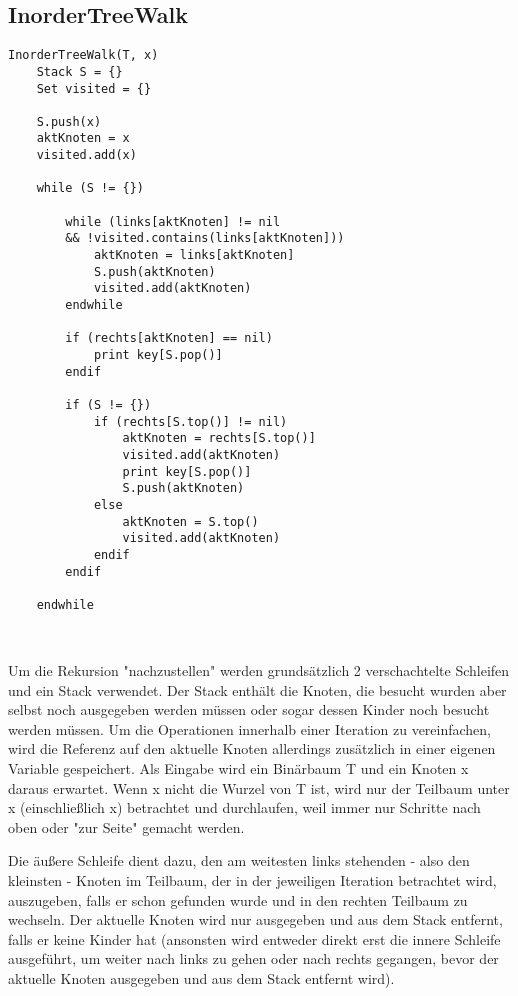 \subsection*{InorderTreeWalk}

\begin{lstlisting}
InorderTreeWalk(T, x)
	Stack S = {}
	Set visited = {}
	
	S.push(x)
	aktKnoten = x
	visited.add(x)
	
	while (S != {})
	
		while (links[aktKnoten] != nil 
		&& !visited.contains(links[aktKnoten]))
			aktKnoten = links[aktKnoten]
			S.push(aktKnoten)
			visited.add(aktKnoten)
		endwhile

		if (rechts[aktKnoten] == nil)
			print key[S.pop()]
		endif
			
		if (S != {})
			if (rechts[S.top()] != nil)
				aktKnoten = rechts[S.top()]
				visited.add(aktKnoten)
				print key[S.pop()]
				S.push(aktKnoten)
			else
				aktKnoten = S.top()
				visited.add(aktKnoten)
			endif
		endif
		
	endwhile
\end{lstlisting}

\begin{tabbing}
\\
\end{tabbing}

Um die Rekursion "nachzustellen" werden grundsätzlich 2 verschachtelte Schleifen und ein Stack verwendet. Der Stack enthält die Knoten, die besucht wurden aber selbst noch ausgegeben werden müssen oder sogar dessen Kinder noch besucht werden müssen. Um die Operationen innerhalb einer Iteration zu vereinfachen, wird die Referenz auf den aktuelle Knoten allerdings zusätzlich in einer eigenen Variable gespeichert. Als Eingabe wird ein Binärbaum T und ein Knoten x daraus erwartet. Wenn x nicht die Wurzel von T ist, wird nur der Teilbaum unter x (einschließlich x) betrachtet und durchlaufen, weil immer nur Schritte nach oben oder "zur Seite" gemacht werden.

Die äußere Schleife dient dazu, den am weitesten links stehenden - also den kleinsten - Knoten im Teilbaum, der in der jeweiligen Iteration betrachtet wird, auszugeben, falls er schon gefunden wurde und in den rechten Teilbaum zu wechseln. 
Der aktuelle Knoten wird nur ausgegeben und aus dem Stack entfernt, falls er keine Kinder hat (ansonsten wird entweder direkt erst die innere Schleife ausgeführt, um weiter nach links zu gehen oder nach rechts gegangen, bevor der aktuelle Knoten ausgegeben und aus dem Stack entfernt wird).

